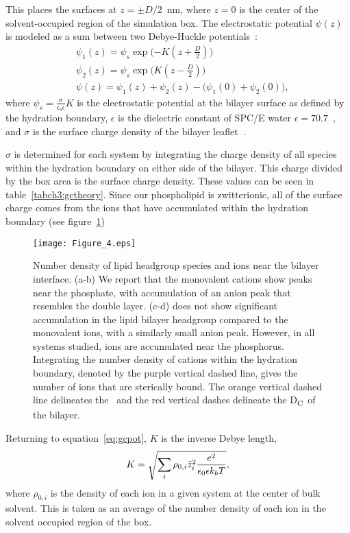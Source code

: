 This places the surfaces at $z=\pm D/2$~nm, where $z=0$ is the center of the solvent-occupied region of the simulation box.
The electrostatic potential $\psi(z)$ is modeled as a sum between two Debye-Huckle potentials~\cite{israelachvili:2011:intermol}:
\begin{align}
    &\psi_{1}(z) = \psi_s \exp\bigg({-K(z+\frac{D}{2})}\bigg)\\
    &\psi_{2}(z) = \psi_s \exp\bigg({K(z-\frac{D}{2})}\bigg)\\
    \label{eq:gcpot}
    &\psi(z) = \psi_1(z) + \psi_2(z) - \big({\psi_1(0)+\psi_2(0)}\big)\text{,}
\end{align}
where $\psi_s = \frac{\sigma}{\epsilon_0\epsilon} K$ is the electrostatic potential at the bilayer surface
as defined by the hydration boundary, $\epsilon$ 
is the dielectric constant of SPC/E water $\epsilon=70.7$~\cite{reddy:1989:dielectric}, and $\sigma$
is the surface charge density of the bilayer leaflet~\cite{israelachvili:2011:intermol}. 

$\sigma$ is determined for
each system by integrating the charge density of all species within the hydration boundary on either side of the bilayer.
This charge divided by the box area is the surface charge density.
These values can be seen in table~\ref{tabch3:gctheory}. {Since our
    phospholipid is zwitterionic, all of the surface charge comes from the
ions that have accumulated within 
the hydration boundary (see figure~\ref{figch3:dens})}
\begin{figure}[H]
    \caption[Number densities]{Number density of lipid headgroup species and
    ions near the bilayer interface. (a-b) We report that the 
    monovalent cations show peaks near the phosphate, with
    accumulation of an anion peak that resembles the double layer.
    (c-d) \mg does not show significant accumulation in the 
    lipid bilayer headgroup compared to the monovalent ions,
    with a similarly small anion peak. However, in all systems
    studied, ions are accumulated near the phosphorus.
    Integrating the number density of cations within the hydration boundary,
    denoted by the purple vertical dashed line, gives the number of ions that are
    sterically bound. The orange vertical dashed line delineates the \dhh~and the 
    red vertical dashes
delineate the D\textsubscript{C}~of the bilayer.}
    \label{figch3:dens}
    \texttt{[image: Figure\_4.eps]}
\end{figure}

Returning to equation~\ref{eq:gcpot}, $K$ is the inverse Debye length,
\begin{equation}
K=\sqrt{\sum_{i} \rho_{0,i} \bar z_i^2\frac{\text{\si{\elementarycharge}}^2}{\epsilon_0 \epsilon k_bT}},
\label{eq:debyelength}
\end{equation}
where $\rho_{0,i}$ is the density of each ion in a given system at the center of bulk solvent.
This is taken as an average of the number density of each ion in the solvent occupied region of the box.


